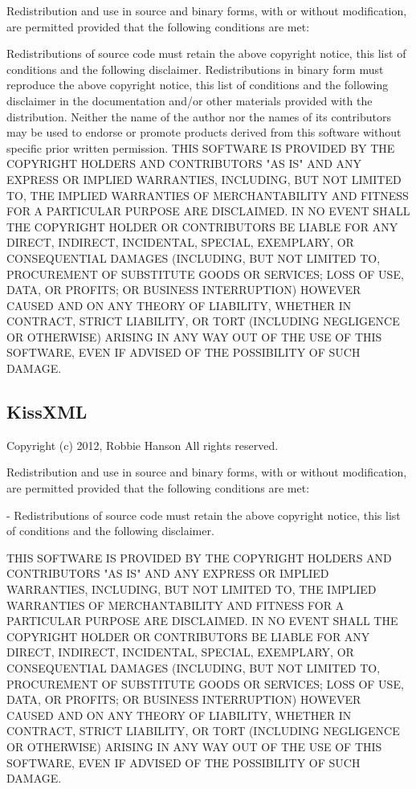 \documentclass[parskip=half]{scrartcl}
\begin{document}
Redistribution and use in source and binary forms, with or without modification,
are permitted provided that the following conditions are met:

Redistributions of source code must retain the above copyright notice, this list
of conditions and the following disclaimer. Redistributions in binary form must
reproduce the above copyright notice, this list of conditions and the following
disclaimer in the documentation and/or other materials provided with the
distribution. Neither the name of the author nor the names of its contributors
may be used to endorse or promote products derived from this software without
specific prior written permission. THIS SOFTWARE IS PROVIDED BY THE COPYRIGHT
HOLDERS AND CONTRIBUTORS "AS IS" AND ANY EXPRESS OR IMPLIED WARRANTIES,
INCLUDING, BUT NOT LIMITED TO, THE IMPLIED WARRANTIES OF MERCHANTABILITY AND
FITNESS FOR A PARTICULAR PURPOSE ARE DISCLAIMED. IN NO EVENT SHALL THE COPYRIGHT
HOLDER OR CONTRIBUTORS BE LIABLE FOR ANY DIRECT, INDIRECT, INCIDENTAL, SPECIAL,
EXEMPLARY, OR CONSEQUENTIAL DAMAGES (INCLUDING, BUT NOT LIMITED TO, PROCUREMENT
OF SUBSTITUTE GOODS OR SERVICES; LOSS OF USE, DATA, OR PROFITS; OR BUSINESS
INTERRUPTION) HOWEVER CAUSED AND ON ANY THEORY OF LIABILITY, WHETHER IN
CONTRACT, STRICT LIABILITY, OR TORT (INCLUDING NEGLIGENCE OR OTHERWISE) ARISING
IN ANY WAY OUT OF THE USE OF THIS SOFTWARE, EVEN IF ADVISED OF THE POSSIBILITY
OF SUCH DAMAGE.

\subsection*{KissXML}
Copyright (c) 2012, Robbie Hanson
All rights reserved.

Redistribution and use in source and binary forms, with or without modification, are permitted provided that the following conditions are met:

- Redistributions of source code must retain the above copyright notice, this list of conditions and the following disclaimer.

THIS SOFTWARE IS PROVIDED BY THE COPYRIGHT HOLDERS AND CONTRIBUTORS "AS IS" AND ANY EXPRESS OR IMPLIED WARRANTIES, INCLUDING, BUT NOT LIMITED TO, THE IMPLIED WARRANTIES OF MERCHANTABILITY AND FITNESS FOR A PARTICULAR PURPOSE ARE DISCLAIMED. IN NO EVENT SHALL THE COPYRIGHT HOLDER OR CONTRIBUTORS BE LIABLE FOR ANY DIRECT, INDIRECT, INCIDENTAL, SPECIAL, EXEMPLARY, OR CONSEQUENTIAL DAMAGES (INCLUDING, BUT NOT LIMITED TO, PROCUREMENT OF SUBSTITUTE GOODS OR SERVICES; LOSS OF USE, DATA, OR PROFITS; OR BUSINESS INTERRUPTION) HOWEVER CAUSED AND ON ANY THEORY OF LIABILITY, WHETHER IN CONTRACT, STRICT LIABILITY, OR TORT (INCLUDING NEGLIGENCE OR OTHERWISE) ARISING IN ANY WAY OUT OF THE USE OF THIS SOFTWARE, EVEN IF ADVISED OF THE POSSIBILITY OF SUCH DAMAGE.
\end{document}
